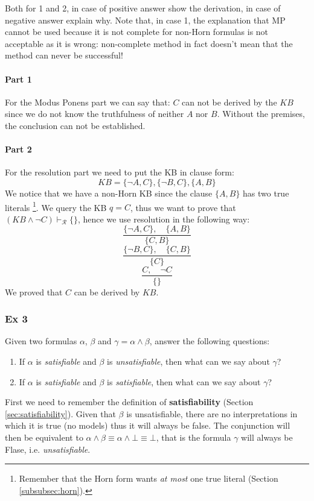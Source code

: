 \documentclass[10pt,a4paper]{article}
\begin{document}
\begin{enumerate}
Both for 1 and 2, in case of positive answer show the derivation, in case of negative answer explain why.
Note that, in case 1, the explanation that MP cannot be used because it is not complete for non-Horn formulas is not acceptable as it is wrong: non-complete method in fact doesn’t mean that the method can never be successful!\\

\paragraph{Part 1}
For the Modus Ponens part we can say that: $C$ can not be derived by the $KB$ since we do not know the truthfulness of neither $A$ nor $B$. Without the premises, the conclusion can not be established.

\paragraph{Part 2}

For the resolution part we need to  put the KB in clause form:
\[KB= \{\neg A,C\},\{\neg B,C\},\{A,B\}\]
We notice that we have a non-Horn KB since the clause $\lbrace A,B \rbrace$ has two true literals \footnote{Remember that the Horn form wants \textit{at most} one true literal (Section \ref{subsubsec:horn}).}. We query the KB $q=C$, thus we want to prove that $(KB \wedge \neg C)\vdash_{\mathcal{R}}\lbrace\rbrace$, hence we use resolution in the following way:
\[\frac{\lbrace \neg A,C\rbrace,\quad \lbrace  A,B \rbrace}{\{C,B\}}\]
\[\frac{\lbrace \neg B,C\rbrace,\quad \lbrace  C,B \rbrace}{\{C\}}\]
\[\frac{ C,\quad \neg C }{\{\}}\]
We proved that $C$  can be derived by $KB$.

\subsubsection{Ex 3}

Given two formulas $\alpha$, $\beta$ and $\gamma=\alpha \wedge \beta$, answer the following questions:
\begin{enumerate}
\item If $\alpha$ is \textit{satisfiable} and $\beta$ is \textit{unsatisfiable}, then what can we say about $\gamma$?
\item If $\alpha$ is \textit{satisfiable} and $\beta$ is \textit{satisfiable}, then what can we say about $\gamma$?\end{enumerate}

First we need to remember the definition of \textbf{satisfiability} (Section \ref{sec:satisfiability}). Given that $\beta$ is unsatisfiable, there are no interpretations in which it is true (no models) thus it will always be false. The conjunction will then be equivalent to $\alpha \wedge\beta \equiv \alpha \wedge \bot\equiv \bot$, that is the formula $\gamma$ will always be Flase, i.e. \textit{unsatisfiable}.\\


\end{enumerate}
\end{document}
